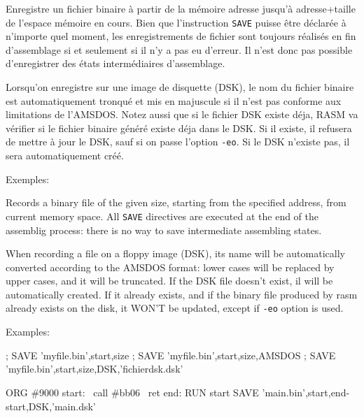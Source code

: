 \begin{xfr}
Enregistre un fichier binaire à partir de la mémoire adresse jusqu'à adresse+taille de l'espace mémoire en cours. Bien que l'instruction \texttt{SAVE} puisse être déclarée à n'importe quel moment, les enregistrements de fichier sont toujours réalisés en fin d'assemblage si et seulement si il n'y a pas eu d'erreur. Il n'est donc pas possible d'enregistrer des états intermédiaires d'assemblage.

Lorsqu'on enregistre sur une image de disquette (DSK), le nom du fichier binaire est automatiquement tronqué et mis en majuscule si il n'est pas conforme aux limitations de l'AMSDOS.
Notez aussi que si le fichier DSK existe déja, RASM va vérifier si le fichier binaire généré existe déja dans le DSK. Si il existe, il refusera de mettre à jour le DSK, sauf si on passe l'option \texttt{-eo}. Si le DSK n'existe pas, il sera automatiquement créé.


Exemples:
\end{xfr}

\begin{xen}
Records a binary file of the given size, starting from the specified address, from current memory space. All \texttt{SAVE} directives are executed at the end of the assemblig process: there is no way to save intermediate assembling states.

When recording a file on a floppy image (DSK), its name will be automatically converted according to the AMSDOS format: lower cases will be replaced by upper cases, and it will be truncated.
If the DSK file doesn't exist, il will be automatically created. If it already exists, and if the binary file produced by rasm already exists on the disk, it WON'T be updated, except if \texttt{-eo} option is used.

Examples:
\end{xen}

\begin{code}
;
SAVE 'myfile.bin',start,size
\medskip
;
SAVE 'myfile.bin',start,size,AMSDOS
\medskip
;
SAVE 'myfile.bin',start,size,DSK,'fichierdsk.dsk'
\end{code}

\begin{code}
ORG \#9000
\medskip
start:
\ call \#bb06
\ ret
end:
\medskip
RUN start
SAVE 'main.bin',start,end-start,DSK,'main.dsk'

\end{code}





